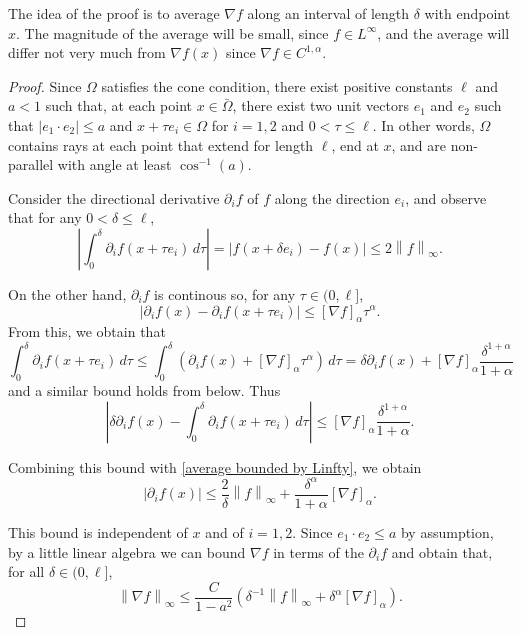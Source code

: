 \documentclass[11pt]{amsart}
\theoremstyle{remark}
\theoremstyle{definition}
\newcommand{\norm}[1]{\left\lVert#1\right\rVert}
\newcommand{\paren}[1]{\left( #1 \right)}
\newcommand{\bracket}[1]{\left[ #1 \right]}
\newcommand{\abs}[1]{\left\lvert #1 \right\rvert}
\newcommand{\del}{\partial}
\newcommand{\grad}{\nabla}
\newcommand{\n}{^{-1}}
\begin{document}
The idea of the proof is to average $\grad f$ along an interval of length $\delta$ with endpoint $x$.  The magnitude of the average will be small, since $f \in L^\infty$, and the average will differ not very much from $\grad f(x)$ since $\grad f \in C^{1,\alpha}$.  

\begin{proof}
Since $\Omega$ satisfies the cone condition, there exist positive constants $\ell$ and $a<1$ such that, at each point $x \in \bar{\Omega}$, there exist two unit vectors $e_1$ and $e_2$ such that $|e_1\cdot e_2| \leq a$ and $x + \tau e_i \in \Omega$ for $i=1,2$ and $0 < \tau \leq \ell$.  In other words, $\Omega$ contains rays at each point that extend for length $\ell$, end at $x$, and are non-parallel with angle at least $\cos\n(a)$.  

Consider the directional derivative $\del_i f$ of $f$ along the direction $e_i$, and observe that for any $0 < \delta \leq \ell$,
\begin{equation} \label{average bounded by Linfty} \abs{\int_0^\delta \del_i f(x + \tau e_i) \,d\tau} = \abs{f(x+\delta e_i) - f(x)} \leq 2 \norm{f}_\infty. \end{equation}

On the other hand, $\del_i f$ is continous so, for any $\tau \in (0,\ell]$,
\[ \abs{\del_i f(x) - \del_i f(x+\tau e_i)} \leq \bracket{\grad f}_\alpha \tau^\alpha. \]
From this, we obtain that
\[ \int_0^\delta \del_i f(x + \tau e_i) \,d\tau \leq \int_0^\delta \paren{\del_i f(x) + \bracket{\grad f}_\alpha \tau^\alpha } \,d\tau = \delta \del_i f(x) + \bracket{\grad f}_\alpha \frac{\delta^{1+\alpha}}{1+\alpha} \]
and a similar bound holds from below.  Thus
\[ \abs{ \delta \del_i f(x) - \int_0^\delta \del_i f(x + \tau e_i) \,d\tau} \leq \bracket{\grad f}_\alpha \frac{\delta^{1+\alpha}}{1+\alpha}. \]

Combining this bound with \eqref{average bounded by Linfty}, we obtain
\[ \abs{\del_i f(x)} \leq \frac{2}{\delta} \norm{f}_\infty + \frac{\delta^\alpha}{1+\alpha} \bracket{\grad f}_\alpha. \]

This bound is independent of $x$ and of $i=1,2$.  Since $e_1 \cdot e_2 \leq a$ by assumption, by a little linear algebra we can bound $\grad f$ in terms of the $\del_i f$ and obtain that, for all $\delta \in (0,\ell]$,
\[ \norm{\grad f}_\infty \leq \frac{C}{1-a^2} \paren{ \delta\n \norm{f}_\infty + \delta^\alpha \bracket{\grad f}_\alpha }. \]

\end{proof}
\end{document}
